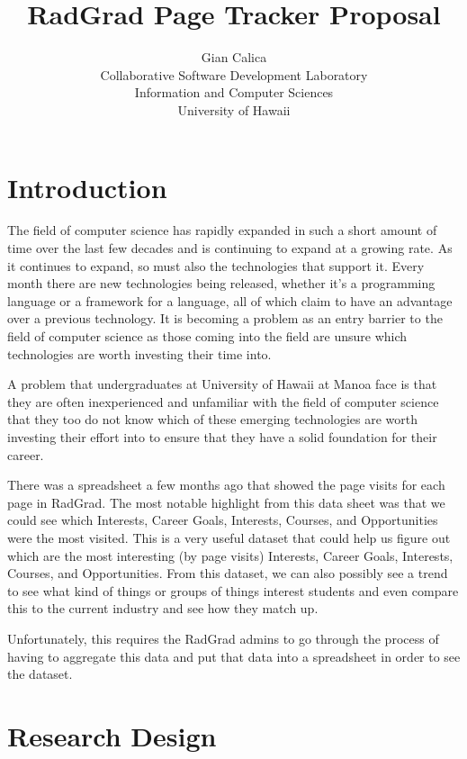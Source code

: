 \documentclass[english]{proposalnsf}
\title{RadGrad Page Tracker Proposal}
\author{Gian Calica \\Collaborative Software Development Laboratory \\ Information and Computer Sciences \\ University of Hawaii}
\begin{document}
  \maketitle
  \tableofcontents
  \newpage

  \section{Introduction}
  \label{sec:introduction}
  The field of computer science has rapidly expanded in such a short amount of time over the last few decades and is
  continuing to expand at a growing rate.
  As it continues to expand, so must also the technologies that support it.
  Every month there are new technologies being released, whether it's a programming language or a framework for a
  language, all of which claim to have an advantage over a previous technology.
  It is becoming a problem as an entry barrier to the field of computer science as those coming into the field are
  unsure which technologies are worth investing their time into.

  A problem that undergraduates at University of Hawaii at Manoa face is that they are often inexperienced and unfamiliar with the field of computer science that they too do not know which of these emerging technologies are worth investing their effort into to ensure that they have a solid foundation for their career.

  There was a spreadsheet a few months ago that showed the page visits for each page in RadGrad.
  The most notable highlight from this data sheet was that we could see which Interests, Career Goals, Interests, Courses, and Opportunities were the most visited.
  This is a very useful dataset that could help us figure out which are the most interesting (by page visits) Interests, Career Goals, Interests, Courses, and Opportunities.
  From this dataset, we can also possibly see a trend to see what kind of things or groups of things interest students and even compare this to the current industry and see how they match up.

  Unfortunately, this requires the RadGrad admins to go through the process of having to aggregate this data and put that data into a spreadsheet in order to see the dataset.

  \section{Research Design}
  \label{sec:research-design}
\end{document}
